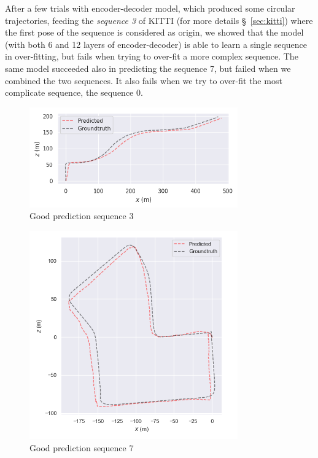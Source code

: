 After a few trials with encoder-decoder model, which produced some circular trajectories, feeding the \textit{sequence 3} of KITTI (for more details \S~\ref{sec:kitti}) where the first pose of the sequence is considered as origin, we showed that the model (with both 6 and 12 layers of encoder-decoder) is able to learn a single sequence in over-fitting, but fails when trying to over-fit a more complex sequence.
The same model succeeded also in predicting the sequence 7, but failed when we combined the two sequences.
It also fails when we try to over-fit the most complicate sequence, the sequence 0.
\begin{figure}[H]
    \centering
    \includegraphics[width=0.8\textwidth]{images/6_1_well_predicted_seq_3}
    \caption{Good prediction sequence 3}\label{fig:well-predicted-seq-3}
\end{figure}
\begin{figure}[H]
    \centering
    \includegraphics[width=0.8\textwidth]{images/6_1_well_predicted_seq_7}
    \caption{Good prediction sequence 7}\label{fig:well-predicted-seq-7}
\end{figure}

